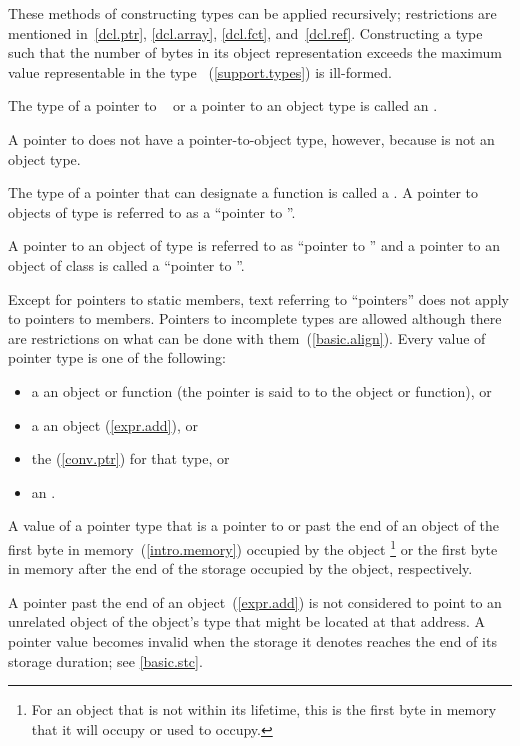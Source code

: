 \pnum
These methods of constructing types can be applied recursively;
restrictions are mentioned in~\ref{dcl.ptr}, \ref{dcl.array},
\ref{dcl.fct}, and~\ref{dcl.ref}. Constructing a type such that the number of
bytes in its object representation exceeds the maximum value representable in
the type ~(\ref{support.types}) is ill-formed.

\pnum
{}%
The type of a pointer to \cv{}~ or a pointer to an object type is
called an . \begin{note} A pointer to 
does not have a pointer-to-object type, however, because  is not
an object type. \end{note} The type of a pointer that can designate a function
is called a .
A pointer to objects of type  is referred to as a ``pointer to
''. \begin{example} A pointer to an object of type  is
referred to as ``pointer to '' and a pointer to an object of
class  is called a ``pointer to ''. \end{example}
Except for pointers to static members, text referring to ``pointers''
does not apply to pointers to members. Pointers to incomplete types are
allowed although there are restrictions on what can be done with
them~(\ref{basic.align}).
%
Every value of pointer type is one of the following:
\begin{itemize}
\item
a  an object or function (the pointer is said to  to the object or function), or
\item
a  an object (\ref{expr.add}), or
\item
the  (\ref{conv.ptr}) for that type, or
\item
an .
\end{itemize}
A value of a
pointer type
that is a pointer to or past the end of an object
 of
the first byte in memory~(\ref{intro.memory}) occupied by the object%
\footnote{For an object that is not within its lifetime,
this is the first byte in memory that it will occupy or used to occupy.}
or the first byte in memory
after the end of the storage occupied by the object,
respectively.
\begin{note}
A pointer past the end of an object~(\ref{expr.add})
is not considered to point to an unrelated object
of the object's type
that might be located at that address.
A pointer value becomes invalid
when the storage it denotes
reaches the end of its storage duration;
see \ref{basic.stc}.
\end{note}
